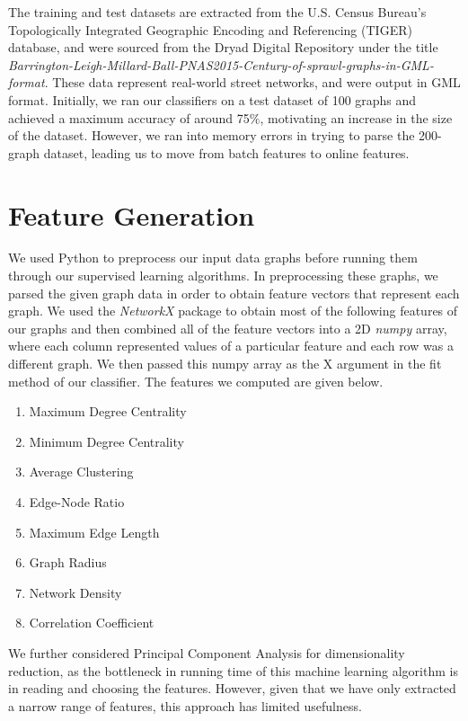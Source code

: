 \documentclass{article}
\begin{document}
The training and test datasets are extracted from the U.S. Census Bureau's Topologically Integrated Geographic Encoding and Referencing (TIGER) database, and were sourced from the Dryad Digital Repository under the title \textit{Barrington-Leigh-Millard-Ball-PNAS2015-Century-of-sprawl-graphs-in-GML-format}. These data represent real-world street networks, and were output in GML format. Initially, we ran our classifiers on a test dataset of 100 graphs and achieved a maximum accuracy of around 75$\%$, motivating an increase in the size of the dataset. However, we ran into memory errors in trying to parse the 200-graph dataset, leading us to move from batch features to online features.

\section{Feature Generation}

We used Python to preprocess our input data graphs before running them through our supervised learning algorithms. In preprocessing these graphs, we parsed the given graph data in order to obtain feature vectors that represent each graph. We used the \textit{NetworkX} package to obtain most of the following features of our graphs and then combined all of the feature vectors into a 2D \textit{numpy} array, where each column represented values of a particular feature and each row was a different graph. We then passed this numpy array as the X argument in the fit method of our classifier. The features we computed are given below.

\begin{enumerate}
\item Maximum Degree Centrality
\item Minimum Degree Centrality
\item Average Clustering
\item Edge-Node Ratio
\item Maximum Edge Length
\item Graph Radius
\item Network Density
\item Correlation Coefficient

\end{enumerate}

We further considered Principal Component Analysis for dimensionality reduction, as the bottleneck in running time of this machine learning algorithm is in reading and choosing the features. However, given that we have only extracted a narrow range of features, this approach has limited usefulness.
\end{document}
